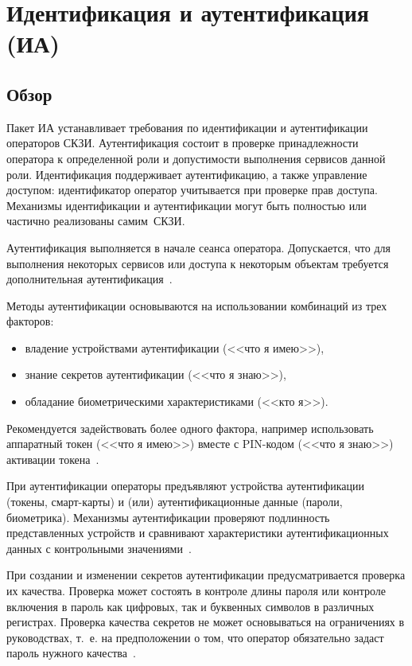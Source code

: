 \section{Идентификация и аутентификация (ИА)}\label{IA}

\subsection{Обзор}\label{IA.Intro}

Пакет ИА устанавливает требования по идентификации и аутентификации операторов 
СКЗИ. Аутентификация состоит в проверке принадлежности оператора к определенной 
роли и допустимости выполнения сервисов данной роли. Идентификация поддерживает 
аутентификацию, а также управление доступом: идентификатор оператор 
учитывается при проверке прав доступа.
%
Механизмы идентификации и аутентификации могут быть полностью или частично
реализованы самим~СКЗИ.

Аутентификация выполняется в начале сеанса оператора. Допускается, что для
выполнения некоторых сервисов или доступа к некоторым объектам требуется
дополнительная аутентификация~.

Методы аутентификации основываются на использовании комбинаций из трех факторов:
\begin{itemize}
\item
владение устройствами аутентификации (<<что я имею>>), 
\item
знание секретов аутентификации (<<что я знаю>>), 
\item
обладание биометрическими характеристиками (<<кто я>>).
\end{itemize}

Рекомендуется задействовать более одного фактора, например использовать 
аппаратный токен (<<что я имею>>) вместе с PIN-кодом (<<что я знаю>>) 
активации токена~.

При аутентификации операторы предъявляют устройства аутентификации 
(токены, смарт-карты) и (или) аутентификационные данные (пароли, биометрика).
%
Механизмы аутентификации проверяют подлинность представленных устройств и
сравнивают характеристики аутентификационных данных с контрольными
значениями~.

При создании и изменении секретов аутентификации предусматривается проверка их
качества. Проверка может состоять в контроле длины пароля или контроле включения
в пароль как цифровых, так и буквенных символов в различных регистрах. Проверка
качества секретов не может основываться на ограничениях в руководствах, т.~е. на
предположении о том, что оператор обязательно задаст пароль нужного
качества~.

